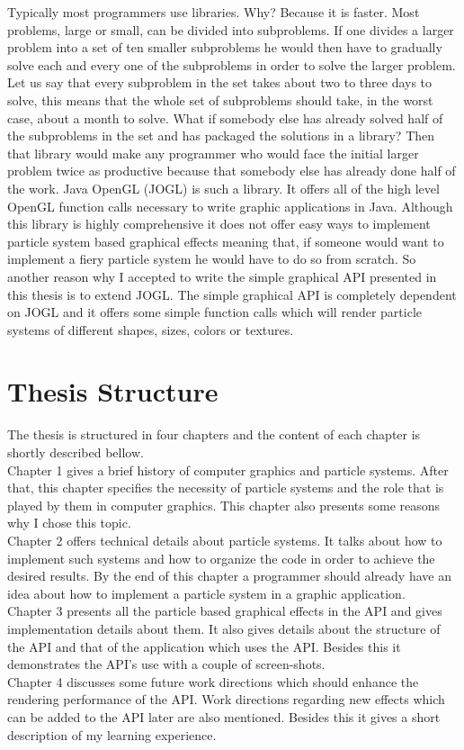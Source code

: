 Typically most programmers use libraries. Why? Because it is faster. Most problems, large or small, can be divided into subproblems. If one divides a larger problem into a set of ten smaller subproblems he would then have to gradually solve each and every one of the subproblems in order to solve the larger problem. Let us say that every subproblem in the set takes about two to three days to solve, this means that the whole set of subproblems should take, in the worst case, about a month to solve. What if somebody else has already solved half of the subproblems in the set and has packaged the solutions in a library? Then that library would make any programmer who would face the initial larger problem twice as productive because that somebody else has already done half of the work. Java OpenGL (JOGL) is such a library. It offers all of the high level OpenGL function calls necessary to write graphic applications in Java. Although this library is highly comprehensive it does not offer easy ways to implement particle system based graphical effects meaning that, if someone would want to implement a fiery particle system he would have to do so from scratch. So another reason why I accepted to write the simple graphical API presented in this thesis is to extend JOGL. The simple graphical API is completely dependent on JOGL and it offers some simple function calls which will render particle systems of different shapes, sizes, colors or textures.\\

\section{Thesis Structure}
The thesis is structured in four chapters and the content of each chapter is shortly described bellow.\\

Chapter 1 gives a brief history of computer graphics and particle systems. After that, this chapter specifies the necessity of particle systems and the role that is played by them in computer graphics. This chapter also presents some reasons why I chose this topic.\\

Chapter 2 offers technical details about particle systems. It talks about how to implement such systems and how to organize the code in order to achieve the desired results. By the end of this chapter a programmer should already have an idea about how to implement a particle system in a graphic application.\\

Chapter 3 presents all the particle based graphical effects in the API and gives implementation details about them. It also gives details about the structure of the API and that of the application which uses the API. Besides this it demonstrates the API's use with a couple of screen-shots.\\

Chapter 4 discusses some future work directions which should enhance the rendering performance of the API. Work directions regarding new effects which can be added to the API later are also mentioned. Besides this it gives a short description of my learning experience.